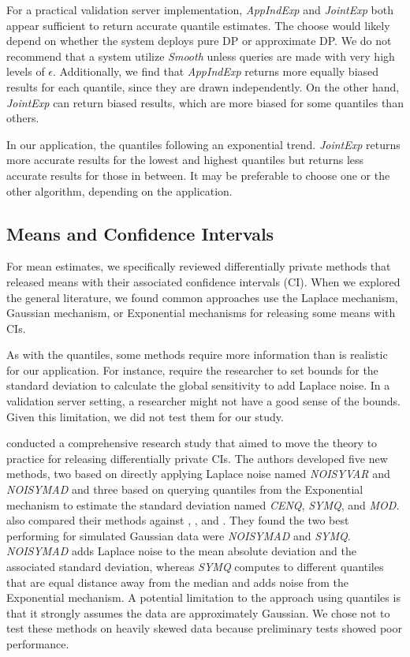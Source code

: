 For a practical validation server implementation, \textit{AppIndExp} and \textit{JointExp} both appear sufficient to return accurate quantile estimates. The choose would likely depend on whether the system deploys pure DP or approximate DP. We do not recommend that a system utilize \textit{Smooth} unless queries are made with very high levels of $\epsilon$. Additionally, we find that \textit{AppIndExp} returns more equally biased results for each quantile, since they are drawn independently. On the other hand, \textit{JointExp} can return biased results, which are more biased for some quantiles than others.

In our application, the quantiles following an exponential trend. \textit{JointExp} returns more accurate results for the lowest and highest quantiles but returns less accurate results for those in between. It may be preferable to choose one or the other algorithm, depending on the application.

\subsection{Means and Confidence Intervals}
For mean estimates, we specifically reviewed differentially private methods that released means with their associated confidence intervals (CI). When we explored the general literature, we found common approaches use the Laplace mechanism, Gaussian mechanism, or Exponential mechanisms for releasing some means with CIs.

As with the quantiles, some methods require more information than is realistic for our application. For instance, \citet{karwa2017finite, bowen2020comparative, d2015differential, biswas2020coinpress} require the researcher to set bounds for the standard deviation to calculate the global sensitivity to add Laplace noise. In a validation server setting, a researcher might not have a good sense of the bounds. Given this limitation, we did not test them for our study.

\citet{du2020differentially} conducted a comprehensive research study that aimed to move the theory to practice for releasing differentially private CIs. The authors developed five new methods, two based on directly applying Laplace noise named \textit{NOISYVAR} and \textit{NOISYMAD} and three based on querying quantiles from the Exponential mechanism  to estimate the standard deviation named \textit{CENQ}, \textit{SYMQ}, and \textit{MOD}. \citet{du2020differentially} also compared their methods against \citet{karwa2017finite}, \citet{d2015differential}, and \citet{brawner2018bootstrap}. They found the two best performing for simulated Gaussian data were \textit{NOISYMAD} and \textit{SYMQ}. \textit{NOISYMAD} adds Laplace noise to the mean absolute deviation and the associated standard deviation, whereas \textit{SYMQ} computes to different quantiles that are equal distance away from the median and adds noise from the Exponential mechanism. A potential limitation to the approach using quantiles is that it strongly assumes the data are approximately Gaussian. We chose not to test these methods on heavily skewed data because preliminary tests showed poor performance.

